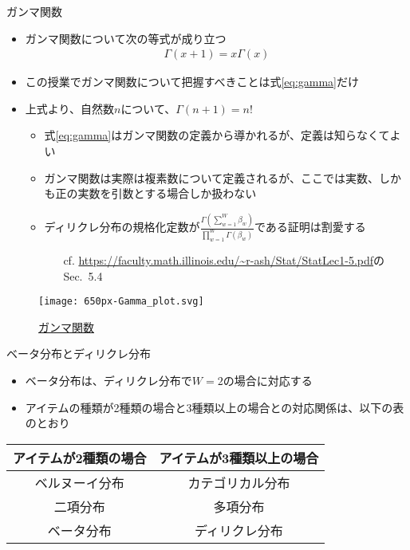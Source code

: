 \documentclass[aspectratio=169,unicode,dvipdfmx,14pt]{beamer}
\begin{document}
\begin{frame}{ガンマ関数}
\begin{itemize}
\item ガンマ関数について次の等式が成り立つ
\begin{align}
\Gamma(x+1)=x\Gamma(x) 
\label{eq:gamma}
\end{align}
\item この授業でガンマ関数について把握すべきことは式\eqref{eq:gamma}だけ
\item 上式より、自然数$n$について、$\Gamma(n+1)=n!$
\begin{itemize}
\item 式\eqref{eq:gamma}はガンマ関数の定義から導かれるが、定義は知らなくてよい
\item ガンマ関数は実際は複素数について定義されるが、ここでは実数、しかも正の実数を引数とする場合しか扱わない
\item ディリクレ分布の規格化定数が$\frac{\Gamma(\sum_{w=1}^W \beta_w)}{\prod_{w=1}^W\Gamma(\beta_w)}$である証明は割愛する
\begin{itemize}
\item[cf.] {\scriptsize \href{https://faculty.math.illinois.edu/\~r-ash/Stat/StatLec1-5.pdf}{\url{https://faculty.math.illinois.edu/~r-ash/Stat/StatLec1-5.pdf}}のSec.~5.4}
\end{itemize}
\end{itemize}
\end{itemize}
\end{frame}

\begin{frame}
\begin{figure}[htbp]
\begin{center}
\texttt{[image: 650px-Gamma\_plot.svg]}
\caption{\href{https://en.wikipedia.org/wiki/Gamma_function}{ガンマ関数}}
\label{}
\end{center}
\end{figure}
\end{frame}

\begin{frame}{ベータ分布とディリクレ分布}
\begin{itemize}
\item ベータ分布は、ディリクレ分布で$W=2$の場合に対応する
\item アイテムの種類が2種類の場合と3種類以上の場合との対応関係は、以下の表のとおり
\end{itemize}
\begin{table}
\begin{center}
\begin{tabular}{|c|c|}
\hline アイテムが2種類の場合 & アイテムが3種類以上の場合 \\ \hline
ベルヌーイ分布 & カテゴリカル分布 \\
二項分布 & 多項分布 \\
ベータ分布 & ディリクレ分布 \\ \hline
\end{tabular}
\end{center}
\end{table}
\end{frame}
\end{document}
